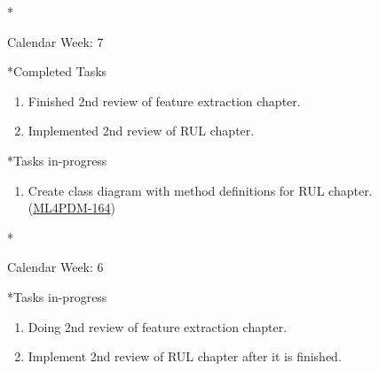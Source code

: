 \documentclass[11pt,a4paper]{article}
\begin{document}
\newpage
\begin{section}*{Calendar Week: 7 \hfill \date{19 February, 2021}}
 \begin{refsection}
   \begin{subsection}*{Completed Tasks}
     \begin{enumerate}
       \item
             Finished 2nd review of feature extraction chapter.
       \item
             Implemented 2nd review of RUL chapter.
     \end{enumerate}
   \end{subsection}
   \begin{subsection}*{Tasks in-progress}
     \begin{enumerate}
       \item
             Create class diagram with method definitions for RUL chapter.\\(\href{https://ml4pdm.atlassian.net/browse/ML4PDM-164}{ML4PDM-164})
     \end{enumerate}
   \end{subsection}
 \end{refsection}
\end{section}

\newpage
\begin{section}*{Calendar Week: 6 \hfill \date{12 February, 2021}}
 \begin{refsection}
   \begin{subsection}*{Tasks in-progress}
     \begin{enumerate}
       \item
             Doing 2nd review of feature extraction chapter.
       \item
             Implement 2nd review of RUL chapter after it is finished.
     \end{enumerate}
   \end{subsection}
 \end{refsection}
\end{section}
\end{document}
